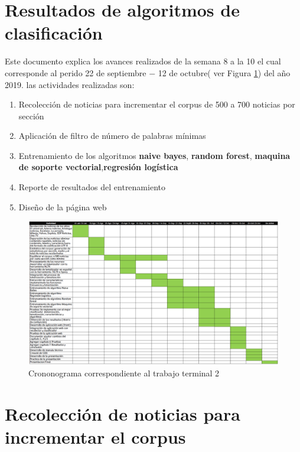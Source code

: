 \section{Resultados de algoritmos de clasificación}

Este documento explica los avances realizados de la semana 8 a la 10 el cual corresponde al perido 22 de septiembre $-$ 12 de octubre( ver Figura \ref{fig:cronograma}) del año 2019. las actividades realizadas son:

\begin{enumerate}
	\item Recolección de noticias para incrementar el corpus de 500 a 700 noticias por sección
	\item Aplicación de filtro de número de palabras mínimas	
	\item Entrenamiento de los algoritmos \textbf{naive bayes}, \textbf{random forest}, \textbf{maquina de soporte vectorial},\textbf{regresión logística}
	\item Reporte de resultados del entrenamiento
	\item Diseño de la página web
\end{enumerate} 

\begin{figure}[h]
\centering
\includegraphics[scale=0.4]{imagenes/Cronograma.png}
\caption{Crononograma correspondiente al trabajo terminal 2}
\label{fig:cronograma}
\end{figure}

\section{Recolección de noticias para incrementar el corpus}

